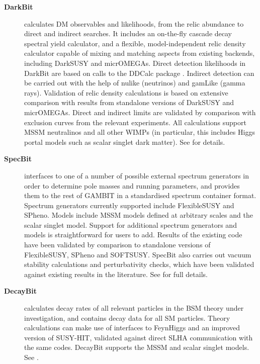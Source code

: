 \documentclass[pdftex,twocolumn,epjc3_preprint,runningheads]{svjour3}
\renewcommand{\_}{\discretionary{\underscore}{}{\underscore}}
\newcommand{\gambit}{\textsf{GAMBIT}\xspace}
\newcommand{\darkbit}{\textsf{DarkBit}\xspace}
\newcommand{\specbit}{\textsf{SpecBit}\xspace}
\newcommand{\decaybit}{\textsf{DecayBit}\xspace}
\newcommand{\GB}{\gambit}
\newcommand{\ds}{\textsf{DarkSUSY}\xspace}
\newcommand{\darksusy}{\ds}
\newcommand{\micromegas}{\textsf{micrOMEGAs}\xspace}
\newcommand{\feynhiggs}{\textsf{FeynHiggs}\xspace}
\newcommand{\FH}{\feynhiggs}
\newcommand\flexiblesusy{\FlexibleSUSY}
\newcommand\FlexibleSUSY{\textsf{FlexibleSUSY}\xspace}
\newcommand\SOFTSUSY{\textsf{SOFTSUSY}\xspace}
\newcommand\SUSYHIT{\textsf{SUSY-HIT}\xspace}
\newcommand\susyhit{\SUSYHIT}
\newcommand\SPheno{\textsf{SPheno}\xspace}
\newcommand\nulike{\textsf{nulike}\xspace}
\newcommand\gamLike{\textsf{gamLike}\xspace}
\newcommand\gamlike{\gamLike}
\newcommand\ddcalc{\textsf{DDCalc}\xspace}
\begin{document}
\begin{description}
\item[\textbf{\darkbit}\!]calculates DM observables and likelihoods, from the relic abundance to direct and indirect searches.  It includes an on-the-fly cascade decay spectral yield calculator, and a flexible, model-independent relic density calculator capable of mixing and matching aspects from existing backends, including \darksusy \cite{darksusy} and \micromegas \cite{Belanger:2001fz,Belanger:2004yn,Belanger:2006is,Belanger:2010gh,Belanger:2013oya,Belanger:2014vza}.  Direct detection likelihoods in \darkbit are based on calls to the \ddcalc package \cite{DarkBit}.  Indirect detection can be carried out with the help of \nulike \cite{IC79_SUSY} (neutrinos) and \gamlike \cite{DarkBit} (gamma rays).  Validation of relic density calculations is based on extensive comparison with results from standalone versions of \darksusy and \micromegas.  Direct and indirect limits are validated by comparison with exclusion curves from the relevant experiments.  All calculations support MSSM neutralinos and all other WIMPs (in particular, this includes Higgs portal models such as scalar singlet dark matter).  See \cite{DarkBit} for details.
\item[\textbf{\specbit}\!]interfaces to one of a number of possible external spectrum generators in order to determine pole masses and running parameters, and provides them to the rest of \GB in a standardised spectrum container format.  Spectrum generators currently supported include \flexiblesusy \cite{Athron:2014yba} and \SPheno \cite{Porod:2003um,Porod:2011nf}. Models include MSSM models defined at arbitrary scales and the scalar singlet model.  Support for additional spectrum generators and models is straightforward for users to add.  Results of the existing code have been validated by comparison to standalone versions of \flexiblesusy, \SPheno and \SOFTSUSY \cite{Allanach:2001kg,Allanach:2009bv,Allanach:2011de,Allanach:2013kza,Allanach:2014nba}. \specbit also carries out vacuum stability calculations and perturbativity checks, which have been validated against existing results in the literature.  See \cite{SDPBit} for full details.
\item[\textbf{\decaybit}\!]calculates decay rates of all relevant particles in the BSM theory under investigation, and contains decay data for all SM particles.  Theory calculations can make use of interfaces to \FH \cite{Bahl:2017aev,Bahl:2016brp,Hahn:2013ria,Frank:2006yh,Degrassi:2002fi,Heinemeyer:1998np,Heinemeyer:1998yj} and an improved version of \susyhit \cite{Djouadi:2006bz,Muhlleitner:2003vg,Djouadi:2002ze,Djouadi:1997yw}, validated against direct SLHA communication with the same codes.  \decaybit supports the MSSM and scalar singlet models.  See \cite{SDPBit}.

\end{description}
\end{document}
